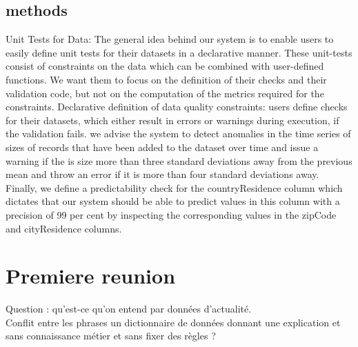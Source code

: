 \documentclass{article}
\begin{document}
\subsection{methods}
Unit Tests for Data: The general idea behind our system is to enable users to easily define unit tests for their datasets in a declarative manner. These unit-tests consist of constraints on
the data which can be combined with user-defined functions. We want them to focus on the definition of their checks and their validation code, but not on the computation of the metrics required for the constraints.
Declarative definition of data quality constraints: users define checks for their datasets, which either result in errors or warnings during execution, if the validation fails.
we advise the system to detect anomalies in the time series of sizes of records that have been added to the dataset over time and issue a warning if the is size more than three standard deviations away from the previous mean and throw an error if it is more than four standard deviations away. Finally, we define a predictability check for the countryResidence column which dictates that our system should be able to predict values in this column with a precision of 99 per cent by inspecting the corresponding values in the zipCode and cityResidence columns.

\section{Premiere reunion}

Question : qu’est-ce qu’on entend par données d’actualité.  \\

Conflit entre les phrases un dictionnaire de données donnant une explication et sans connaissance métier et sans fixer des règles ?  \\
\end{document}
